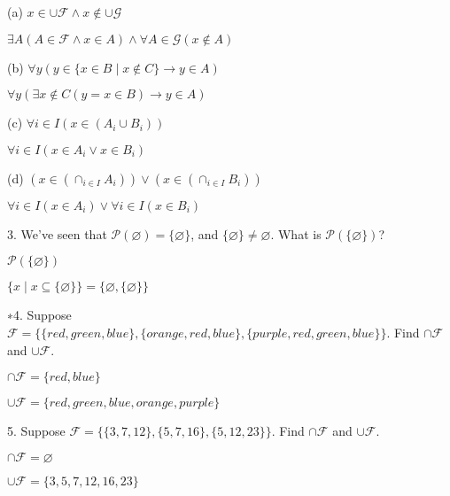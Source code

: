 \documentclass{article}
\begin{document}
(a) $x \in \cup \mathcal{F} \land x \notin \cup \mathcal{G}$

$\exists A (A \in \mathcal{F} \land x \in A) \land \forall A \in \mathcal{G} (x \notin A)$

\vspace{20pt}

(b) $\forall y (y \in \{x \in B \mid x \notin C\} \to y \in A)$

$\forall y (\exists x \notin C (y = x \in B) \to y \in A)$


\vspace{20pt}

(c) $\forall i \in I (x \in (A_i \cup B_i))$

$\forall i \in I (x \in A_i \lor x \in B_i)$

\vspace{20pt}

(d) $(x \in (\cap_{i \in I} A_i)) \lor (x \in (\cap_{i \in I} B_i))$

$\forall i \in I (x \in A_i) \lor \forall i \in I (x \in B_i)$

\vspace{30pt}

3. We've seen that $\mathcal{P} (\varnothing) = \{\varnothing\}$, and $\{\varnothing\} \neq \varnothing$. What is $\mathcal{P} (\{\varnothing\})$?
\vspace{30pt}

$\mathcal{P} (\{\varnothing\})$

$\{x \mid x \subseteq \{\varnothing\}\} = \{\varnothing, \{\varnothing\}\}$

\vspace{30pt}

∗4. Suppose $\mathcal{F} = \{\{red, green, blue\}, \{orange, red, blue\}, \{purple, red, green, blue\}\}$. Find $\cap \mathcal{F}$ and $\cup \mathcal{F}$.
\vspace{30pt}

$\cap \mathcal{F} = \{red, blue\}$

$\cup \mathcal{F} = \{red, green, blue, orange, purple\}$

\vspace{30pt}

5. Suppose $\mathcal{F} = \{\{3, 7, 12\},\{5, 7, 16\},\{5, 12, 23\}\}$. Find $\cap \mathcal{F}$ and $\cup \mathcal{F}$.
\vspace{30pt}

$\cap \mathcal{F} = \varnothing$

$\cup \mathcal{F} = \{3,5,7,12,16,23\}$
\end{document}
